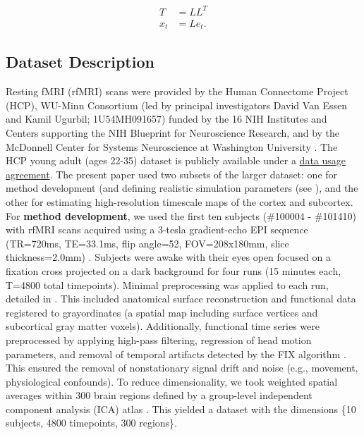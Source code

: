 \documentclass[main.tex]{subfiles}
\begin{document}
\begin{align*}
    T &= LL^T\\
    x_t &= L e_t.
\end{align*}

\subsection{Dataset Description}\label{sec:dataset-description}

Resting fMRI (rfMRI) scans were provided by the Human Connectome Project (HCP), WU-Minn Consortium (led by principal investigators David Van Essen and Kamil Ugurbil; 1U54MH091657) funded by the 16 NIH Institutes and Centers supporting the NIH Blueprint for Neuroscience Research, and by the McDonnell Center for Systems Neuroscience at Washington University \citep{van_essen_wu-minn_2013}. The HCP young adult (ages 22-35) dataset is publicly available under a \href{https://www.humanconnectome.org/storage/app/media/data_use_terms/DataUseTerms-HCP-Open-Access-26Apr2013.pdf}{data usage agreement}. The present paper used two subsets of the larger dataset: one for method development (and defining realistic simulation parameters (see ), and the other for estimating high-resolution timescale maps of the cortex and subcortex.\\

For \textbf{method development}, we used the first ten subjects (\#100004 - \#101410) with rfMRI scans acquired using a 3-tesla gradient-echo EPI sequence (TR=720ms, TE=33.1ms, flip angle=52\textdegree, FOV=208x180mm, slice thickness=2.0mm) \citep{van_essen_wu-minn_2013}. Subjects were awake with their eyes open focused on a fixation cross projected on a dark background for four runs (15 minutes each, T=4800 total timepoints). Minimal preprocessing was applied to each run, detailed in \citep{glasser_minimal_2013}. This included anatomical surface reconstruction \citep{robinson_msm_2014} and functional data registered to grayordinates (a spatial map including surface vertices and subcortical gray matter voxels). Additionally, functional time series were preprocessed by applying high-pass filtering, regression of head motion parameters, and removal of temporal artifacts detected by the FIX algorithm \citep{salimi-khorshidi_automatic_2014}. This ensured the removal of nonstationary signal drift and noise (e.g., movement, physiological confounds). To reduce dimensionality, we took weighted spatial averages within 300 brain regions defined by a group-level independent component analysis (ICA) atlas \citep{smith_resting-state_2013}. This yielded a dataset with the dimensions \{10 subjects, 4800 timepoints, 300 regions\}.\\
\end{document}
